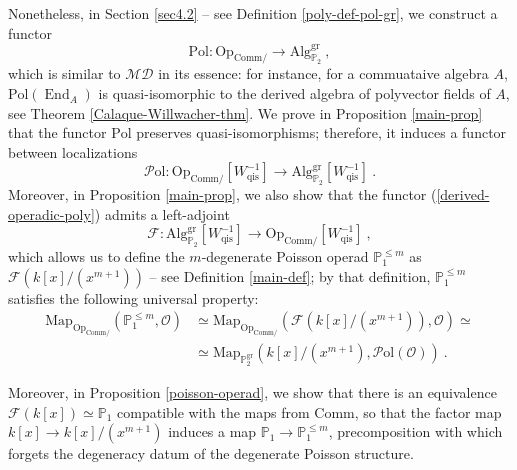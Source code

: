 \documentclass[10pt, oneside]{amsart}
\theoremstyle{plain}
\newcommand{\alg}{\mathrm{Alg}}
\newcommand{\comm}{\mathrm{Comm}}
\DeclareMathOperator{\en}{End}
\newcommand{\F}{\mathcal{F}}
\newcommand{\map}{\mathrm{Map}}
\renewcommand{\O}{\mathcal{O}}
\newcommand{\op}{\mathrm{Op}}
\newcommand{\PP}{\mathbb{P}}
\newcommand{\pol}{\mathrm{Pol}}
\newcommand{\Pol}{\mathcal{P}\mathrm{ol}}
\begin{document}
Nonetheless, in Section \ref{sec4.2} -- see Definition \ref{poly-def-pol-gr}, we construct a functor
\begin{equation*}
\pol \colon \op_{\comm/} \longrightarrow \alg^{\text{gr}}_{\PP_2} \:,
\end{equation*}
which is similar to $\mathcal{MD}$ in its essence: for instance, for a commuataive algebra $A$, $\pol(\en_A)$ is
quasi-isomorphic to the derived algebra of polyvector fields of $A$, see Theorem \ref{Calaque-Willwacher-thm}.
We prove in Proposition \ref{main-prop} that the functor $\pol$ preserves
quasi-isomorphisms; therefore, it induces a functor between localizations
\begin{equation}\label{derived-operadic-poly}
\Pol \colon \op_{\comm/}[W_\text{qis}^{-1}] \longrightarrow \alg^\text{gr}_{\PP_2}[W^{-1}_\text{qis}] \:.
\end{equation}
Moreover, in Proposition \ref{main-prop}, we also show that the functor (\ref{derived-operadic-poly}) admits a left-adjoint
\begin{equation*}
\F \colon \alg^\text{gr}_{\PP_2}[W^{-1}_\text{qis}] \longrightarrow \op_{\comm/}[W_\text{qis}^{-1}] \:,
\end{equation*}
which allows us to define the $m$-degenerate Poisson operad $\PP_1^{\le m}$ as $\F(k[x]/(x^{m+1}))$ -- see Definition \ref{main-def};
by that definition, $\PP_1^{\le m}$
satisfies the following universal property:
\begin{equation*}
\begin{split}
\map_{\op_{\comm/}} (\PP_1^{\le m}, \O) &\simeq \map_{\op_{\comm/}} (\F(k[x]/(x^{m+1})), \O) \simeq \\
&\simeq \map_{\PP_2^\mathrm{gr}} (k[x]/(x^{m+1}), \Pol(\O)) \:.
\end{split}
\end{equation*}

Moreover, in Proposition \ref{poisson-operad}, we show that there is an equivalence $\F(k[x]) \simeq \PP_1$ compatible with the maps 
from $\comm$, so that the factor map $k[x] \to k[x]/(x^{m+1})$ induces a map $\PP_1 \to \PP_1^{\le m}$, precomposition with which 
forgets the degeneracy datum of the degenerate Poisson structure.
\end{document}
